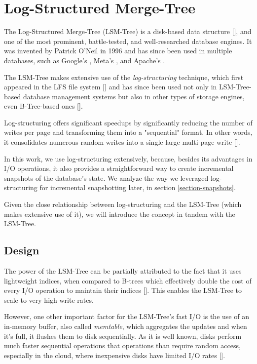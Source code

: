 \section{Log-Structured Merge-Tree}

The Log-Structured Merge-Tree (LSM-Tree) is a disk-based data structure [\cite{lsmtree}], and one of the most prominent, battle-tested, and well-researched database engines.
It was invented by Patrick O'Neil in 1996 and has since been used in multiple databases, such as Google's \cite{leveldb}, Meta's \cite{rocksdb}, and Apache's \cite{cassandra}.

The LSM-Tree makes extensive use of the \textit{log-structuring} technique, which first appeared in the LFS file system [\cite{lsm-filesystem}] and has since been used not only in LSM-Tree-based database management systems but also in other types of storage engines, even B-Tree-based ones [\cite{llama}].

Log-structuring offers significant speedups by significantly reducing the number of writes per page and transforming them into a "sequential" format.
In other words, it consolidates numerous random writes into a single large multi-page write [\cite{llama}].

In this work, we use log-structuring extensively, because, besides its advantages in I/O operations, it also provides a straightforward way to create incremental snapshots of the database's state.
We analyze the way we leveraged log-structuring for incremental snapshotting later, in section \ref{section-snapshots}.

Given the close relationship between log-structuring and the LSM-Tree (which makes extensive use of it), we will introduce the concept in tandem with the LSM-Tree.

\subsection{Design}
\label{subsection-lsm-design}

The power of the LSM-Tree can be partially attributed to the fact that it uses lightweight indices, when compared to B-trees which effectively double the cost of every I/O operation to maintain their indices [\cite{lsmtree}].
This enables the LSM-Tree to scale to very high write rates.

However, one other important factor for the LSM-Tree's fast I/O is the use of an in-memory buffer, also called \textit{memtable}, which aggregates the updates and when it's full, it flushes them to disk sequentially.
As it is well known, disks perform much faster sequential operations that operations than require random access, especially in the cloud, where inexpensive disks have limited I/O rates [\cite{llama}].

